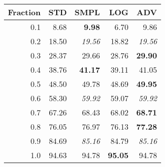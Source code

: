 \documentclass{standalone}
\begin{document}
\begin{tabular}{r|rrrr}
      \toprule
      Fraction & STD & SMPL & LOG & ADV\\
      \midrule
      0.1 & 8.68 & \textbf{9.98} & 6.70 & 9.86\\
  0.2 & 18.50 & \emph{19.56} & 18.82 & \emph{19.56}\\
  0.3 & 28.37 & 29.66 & 28.76 & \textbf{29.90}\\
  0.4 & 38.76 & \textbf{41.17} & 39.11 & 41.05\\
  0.5 & 48.50 & 49.78 & 48.69 & \textbf{49.95}\\
  0.6 & 58.30 & \emph{59.92} & 59.07 & \emph{59.92}\\
  0.7 & 67.26 & 68.43 & 68.02 & \textbf{68.71}\\
  0.8 & 76.05 & 76.97 & 76.13 & \textbf{77.28}\\
  0.9 & 84.69 & \emph{85.16} & 84.79 & \emph{85.16}\\
  1.0 & 94.63 & 94.78 & \textbf{95.05} & 94.78\\
  \bottomrule
\end{tabular}
\end{document}
